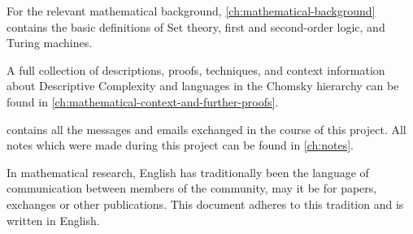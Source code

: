 For the relevant mathematical background, \cref{ch:mathematical-background} contains the basic definitions of Set theory, first and second-order logic, and Turing machines.

A full collection of descriptions, proofs, techniques, and context information about Descriptive Complexity and languages in the Chomsky hierarchy can be found in \cref{ch:mathematical-context-and-further-proofs}.

 contains all the messages and emails exchanged in the course of this project.
All notes which were made during this project can be found in \cref{ch:notes}.

In mathematical research, English has traditionally been the language of communication between members of the community, may it be for papers, exchanges or other publications.
This document adheres to this tradition and is written in English.